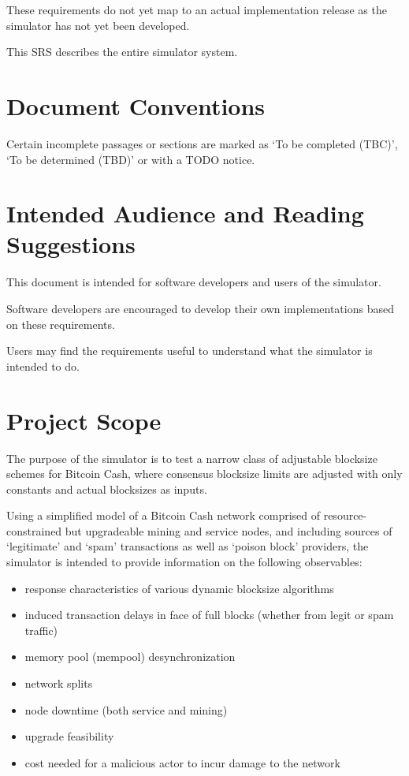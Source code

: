 \documentclass{scrreprt}
\begin{document}
These requirements do not yet map to an actual implementation release
as the simulator has not yet been developed.

This SRS describes the entire simulator system.


\section{Document Conventions}
Certain incomplete passages or sections are marked as `To be completed (TBC)',
`To be determined (TBD)' or with a TODO notice.


\section{Intended Audience and Reading Suggestions}
This document is intended for software developers and users of the simulator.

Software developers are encouraged to develop their own implementations based
on these requirements.

Users may find the requirements useful to understand what the simulator is
intended to do.



\section{Project Scope}
The purpose of the simulator is to test a narrow class of adjustable
blocksize schemes for Bitcoin Cash, where consensus blocksize limits are
adjusted with only constants and actual blocksizes as inputs.

Using a simplified model of a Bitcoin Cash network comprised of resource-constrained
but upgradeable mining and service nodes, and including sources of `legitimate'
and `spam' transactions as well as `poison block' providers, the simulator is
intended to provide information on the following observables:

\begin{itemize}
   \item response characteristics of various dynamic blocksize algorithms
   \item induced transaction delays in face of full blocks (whether from legit or spam traffic)
   \item memory pool (mempool) desynchronization
   \item network splits
   \item node downtime (both service and mining)
   \item upgrade feasibility
   \item cost needed for a malicious actor to incur damage to the network
\end{itemize}
\end{document}

